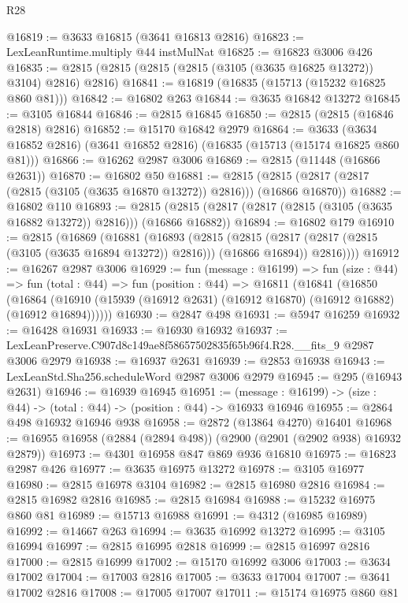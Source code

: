 \begin{lexlean}{R28}
\begin{coremodule}
@16819 := @3633 @16815 (@3641 @16813 @2816)
@16823 := LexLeanRuntime.multiply @44 instMulNat
@16825 := @16823 @3006 @426
@16835 := @2815 (@2815 (@2815 (@2815 (@3105 (@3635 @16825 @13272)) @3104) @2816) @2816)
@16841 := @16819 (@16835 (@15713 (@15232 @16825 @860 @81)))
@16842 := @16802 @263
@16844 := @3635 @16842 @13272
@16845 := @3105 @16844
@16846 := @2815 @16845
@16850 := @2815 (@2815 (@16846 @2818) @2816)
@16852 := @15170 @16842 @2979
@16864 := @3633 (@3634 @16852 @2816) (@3641 @16852 @2816) (@16835 (@15713 (@15174 @16825 @860 @81)))
@16866 := @16262 @2987 @3006
@16869 := @2815 (@11448 (@16866 @2631))
@16870 := @16802 @50
@16881 := @2815 (@2815 (@2817 (@2817 (@2815 (@3105 (@3635 @16870 @13272)) @2816))) (@16866 @16870))
@16882 := @16802 @110
@16893 := @2815 (@2815 (@2817 (@2817 (@2815 (@3105 (@3635 @16882 @13272)) @2816))) (@16866 @16882))
@16894 := @16802 @179
@16910 := @2815
    (@16869
      (@16881
        (@16893
          (@2815
            (@2815 (@2817 (@2817 (@2815 (@3105 (@3635 @16894 @13272)) @2816))) (@16866 @16894))
            @2816))))
@16912 := @16267 @2987 @3006
@16929 := fun (message : @16199) =>
  fun (size : @44) =>
  fun (total : @44) =>
  fun (position : @44) =>
  @16811
    (@16841
      (@16850
        (@16864 (@16910 (@15939 (@16912 @2631) (@16912 @16870) (@16912 @16882) (@16912 @16894))))))
@16930 := @2847 @498
@16931 := @5947 @16259
@16932 := @16428 @16931
@16933 := @16930 @16932
@16937 := LexLeanPreserve.C907d8c149ae8f58657502835f65b96f4.R28.__fits_9 @2987 @3006 @2979
@16938 := @16937 @2631
@16939 := @2853 @16938
@16943 := LexLeanStd.Sha256.scheduleWord @2987 @3006 @2979
@16945 := @295 (@16943 @2631)
@16946 := @16939 @16945
@16951 := (message : @16199) -> (size : @44) -> (total : @44) -> (position : @44) -> @16933 @16946
@16955 := @2864 @498 @16932 @16946 @938
@16958 := @2872 (@13864 @4270) @16401
@16968 := @16955 @16958 (@2884 (@2894 @498)) (@2900 (@2901 (@2902 @938) @16932 @2879))
@16973 := @4301 @16958 @847 @869 @936 @16810
@16975 := @16823 @2987 @426
@16977 := @3635 @16975 @13272
@16978 := @3105 @16977
@16980 := @2815 @16978 @3104
@16982 := @2815 @16980 @2816
@16984 := @2815 @16982 @2816
@16985 := @2815 @16984
@16988 := @15232 @16975 @860 @81
@16989 := @15713 @16988
@16991 := @4312 (@16985 @16989)
@16992 := @14667 @263
@16994 := @3635 @16992 @13272
@16995 := @3105 @16994
@16997 := @2815 @16995 @2818
@16999 := @2815 @16997 @2816
@17000 := @2815 @16999
@17002 := @15170 @16992 @3006
@17003 := @3634 @17002
@17004 := @17003 @2816
@17005 := @3633 @17004
@17007 := @3641 @17002 @2816
@17008 := @17005 @17007
@17011 := @15174 @16975 @860 @81

\end{coremodule}
\end{lexlean}
